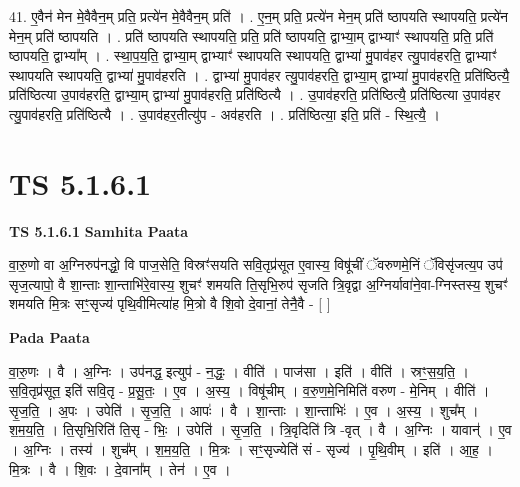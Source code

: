 \documentclass[17pt]{extarticle}
\begin{document}
41. ए॒वैन॑ मेन मे॒वैवैन॒म् प्रति॒ प्रत्ये॑न मे॒वैवैन॒म् प्रति॑ । . ए॒न॒म् प्रति॒ प्रत्ये॑न मेन॒म् प्रति॑ ष्ठापयति स्थापयति॒ प्रत्ये॑न मेन॒म् प्रति॑ ष्ठापयति । . प्रति॑ ष्ठापयति स्थापयति॒ प्रति॒ प्रति॑ ष्ठापयति॒ द्वाभ्या॒म् द्वाभ्याꣳ॑ स्थापयति॒ प्रति॒ प्रति॑ ष्ठापयति॒ द्वाभ्या᳚म् । . स्था॒प॒य॒ति॒ द्वाभ्या॒म् द्वाभ्याꣳ॑ स्थापयति स्थापयति॒ द्वाभ्या॑ मु॒पाव॑हर त्यु॒पाव॑हरति॒ द्वाभ्याꣳ॑ स्थापयति स्थापयति॒ द्वाभ्या॑ मु॒पाव॑हरति । . द्वाभ्या॑ मु॒पाव॑हर त्यु॒पाव॑हरति॒ द्वाभ्या॒म् द्वाभ्या॑ मु॒पाव॑हरति॒ प्रति॑ष्ठित्यै॒ प्रति॑ष्ठित्या उ॒पाव॑हरति॒ द्वाभ्या॒म् द्वाभ्या॑ मु॒पाव॑हरति॒ प्रति॑ष्ठित्यै । . उ॒पाव॑हरति॒ प्रति॑ष्ठित्यै॒ प्रति॑ष्ठित्या उ॒पाव॑हर त्यु॒पाव॑हरति॒ प्रति॑ष्ठित्यै । . उ॒पाव॑हर॒तीत्यु॑प - अव॑हरति । . प्रति॑ष्ठित्या॒ इति॒ प्रति॑ - स्थि॒त्यै॒ । \newline
\pagebreak
{}

\section{ TS 5.1.6.1 }

\textbf{TS 5.1.6.1 } \newline
\textbf{Samhita Paata} \newline

वा॒रु॒णो वा अ॒ग्निरुप॑नद्धो॒ वि पाज॒सेति॒ विस्रꣳ॑सयति सवि॒तृप्र॑सूत ए॒वास्य॒ विषू॑चीं ॅवरुणमे॒निं ॅविसृ॑जत्य॒प उप॑ सृज॒त्यापो॒ वै शा॒न्ताः शा॒न्ताभि॑रे॒वास्य॒ शुचꣳ॑ शमयति ति॒सृभि॒रुप॑ सृजति त्रि॒वृद्वा अ॒ग्निर्यावा॑ने॒वा-ग्निस्तस्य॒ शुचꣳ॑ शमयति मि॒त्रः सꣳ॒॒सृज्य॑ पृथि॒वीमित्या॑ह मि॒त्रो वै शि॒वो दे॒वानां॒ तेनै॒वै - [  ] \newline

\textbf{Pada Paata} \newline

वा॒रु॒णः । वै । अ॒ग्निः । उप॑नद्ध॒ इत्युप॑ - न॒द्धः॒ । वीति॑ । पाज॑सा । इति॑ । वीति॑ । स्रꣳ॒॒स॒य॒ति॒ । स॒वि॒तृप्र॑सूत॒ इति॑ सवि॒तृ - प्र॒सू॒तः॒ । ए॒व । अ॒स्य॒ । विषू॑चीम् । व॒रु॒ण॒मे॒निमिति॑ वरुण - मे॒निम् । वीति॑ । सृ॒ज॒ति॒ । अ॒पः । उपेति॑ । सृ॒ज॒ति॒ । आपः॑ । वै । शा॒न्ताः । शा॒न्ताभिः॑ । ए॒व । अ॒स्य॒ । शुच᳚म् । श॒म॒य॒ति॒ । ति॒सृभि॒रिति॑ ति॒सृ - भिः॒ । उपेति॑ । सृ॒ज॒ति॒ । त्रि॒वृदिति॑ त्रि -वृत् । वै । अ॒ग्निः । यावान्॑ । ए॒व । अ॒ग्निः । तस्य॑ । शुच᳚म् । श॒म॒य॒ति॒ । मि॒त्रः । सꣳ॒॒सृज्येति॑ सं - सृज्य॑ । पृ॒थि॒वीम् । इति॑ । आ॒ह॒ । मि॒त्रः । वै । शि॒वः । दे॒वाना᳚म् । तेन॑ । ए॒व ।  \newline
\end{document}
